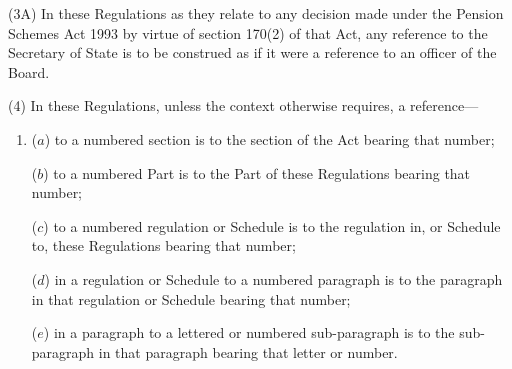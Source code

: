 \documentclass[12pt,a4paper]{article}
\begin{document}
(3A) In these Regulations as they relate to any decision made under the Pension Schemes Act 1993 by virtue of section 170(2) of that Act, any reference to the Secretary of State is to be construed as if it were a reference to an officer of the Board.

(4) In these Regulations, unless the context otherwise requires, a reference—
\begin{enumerate}\item[]
($a$) to a numbered section is to the section of the Act bearing that number;

($b$) to a numbered Part is to the Part of these Regulations bearing that number;

($c$) to a numbered regulation or Schedule is to the regulation in, or Schedule to, these Regulations bearing that number;

($d$) in a regulation or Schedule to a numbered paragraph is to the paragraph in that regulation or Schedule bearing that number;

($e$) in a paragraph to a lettered or numbered sub-paragraph is to the sub-paragraph in that paragraph bearing that letter or number.
\end{enumerate}
\end{document}
